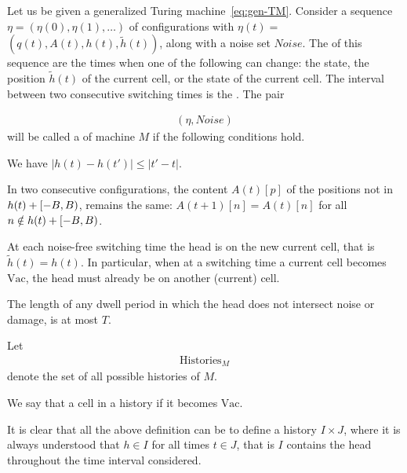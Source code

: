 \documentclass[12pt]{memoir}
\def\B{B}
\newcommand{\h}{h}
\newcommand{\hc}{\tilde h}
\newcommand{\Noise}{\mathit{Noise}}
\newcommand{\Tu}{T}
\newcommand{\Histories}{\mathrm{Histories}}
\newcommand{\Vacant}{\mathrm{Vac}}
\begin{document}
\begin{definition}[History]\label{def:history}
  \begin{sloppypar}
    Let us be given a generalized Turing machine~\eqref{eq:gen-TM}.
    Consider a sequence \( \eta = (\eta(0), \eta(1), \dots) \) of configurations with
    \( \eta(t) = \) \( (q(t), A(t), \h(t), \hc(t)) \), along with a noise set \( \Noise \).
    The  of this sequence 
are the times when one of the following can change:
the state, the position \( \hc(t) \) of the current cell, or the state of the current cell.
The interval between two consecutive switching times is the .
The pair
      \end{sloppypar}
    \begin{align*}
       (\eta,\Noise)
    \end{align*}
    will be called a  of machine \( M \) if the following conditions hold.
        \begin{bullets}
            \item We have \( |\h(t) - \h(t')| \le |t' - t| \).

            \item In two consecutive configurations, the content \( A(t)[p] \) of the positions not in
                  \( \h(t) + \lint{-\B}{\B} \), remains the same:
                  \( A(t+1)[n] = A(t)[n] \) for all \( n \notin \h(t) + \lint{-\B}{\B} \).

            \item At each noise-free switching time the head is on the new current cell, that is
\( \hc(t)=\h(t) \).
In particular, when at a switching time a current cell becomes
\( \Vacant \), the head must already be on another (current) cell.

            \item The length of any dwell period in which the head does not intersect
noise or damage, is at most \( \Tu \).

        \end{bullets}
    Let
        \begin{align*}
            \Histories_{M}
        \end{align*}
    denote the set of all possible histories of \( M \).

We say that a cell  in a history if it becomes \( \Vacant \).

It is clear that all the above definition can be  to define a history
 \( I\times J \), 
where it is always understood that \( \h\in I \) for all times \( t\in J \),
that is \( I \) contains the head throughout the time interval considered.

\end{definition}
\end{document}
